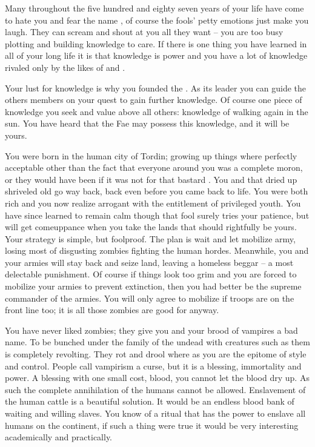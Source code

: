 \documentclass[char]{guildcamp2}
\begin{document}
\name{\cVampire{}}



Many throughout the five hundred and eighty seven years of your life have come to hate you and fear the name \cVampire{\full}, of course the fools' petty emotions just make you laugh. They can scream and shout at you all they want -- you are too busy plotting and building knowledge to care. If there is one thing you have learned in all of your long life it is that knowledge is power and you have a lot of knowledge rivaled only by the likes of \cDemon{} and \cOnyx{}. 

Your lust for knowledge is why you founded the \bLoremasters{}. As its leader you can guide the others members on your quest to gain further knowledge. Of course one piece of knowledge you seek and value above all others: knowledge of walking again in the sun. You have heard that the Fae may possess this knowledge, and it will be yours.   

You were born in the human city of Tordin; growing up things where perfectly acceptable other than the fact that everyone around you was a complete moron, or they would have been if it was not for that bastard \cLich{}. You and that dried up shriveled old \cLich{} go way back, back even before you came back to life. You were both rich and you now realize arrogant with the entitlement of privileged youth. You have since learned to remain calm though that fool \cLich{} surely tries your patience, but \cLich{\they} will get \cLich{\their} comeuppance when you take the lands that should rightfully be yours. Your strategy is simple, but foolproof. The plan is wait and let \cLich{} mobilize \cLich{\their} army, losing most of \cLich{\their} disgusting zombies fighting the human hordes. Meanwhile, you and your armies will stay back and seize \cLich{\their} land, leaving \cLich{\them} a homeless beggar -- a most delectable punishment. Of course if things look too grim and you are forced to mobilize your armies to prevent extinction, then you had better be the supreme commander of the armies. You will only agree to mobilize if \cLich{} troops are on the front line too; it is all those zombies are good for anyway.   

You have never liked zombies; they give you and your brood of vampires a bad name. To be bunched under the family of the undead with creatures such as them is completely revolting. They rot and drool where as you are the epitome of style and control. People call vampirism a curse, but it is a blessing, immortality and power. A blessing with one small cost, blood, you cannot let the blood dry up. As such the complete annihilation of the humans cannot be allowed. Enslavement of the human cattle is a beautiful solution. It would be an endless blood bank of waiting and willing slaves. You know of a ritual that has the power to enslave all humans on the continent, if such a thing were true it would be very interesting academically and practically. 
\end{document}
